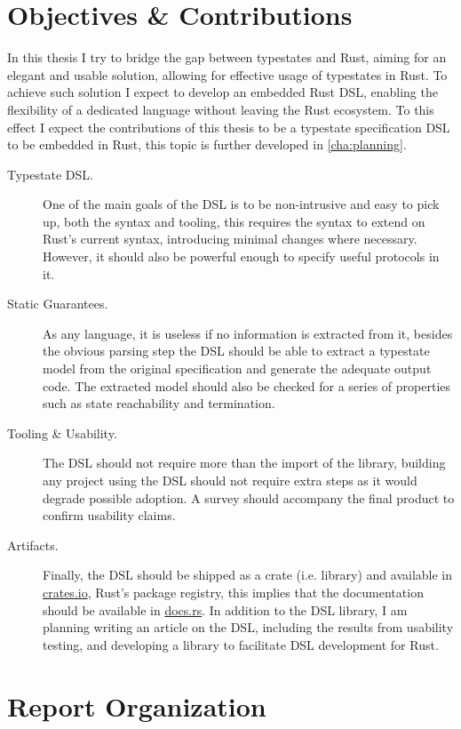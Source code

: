 \section{Objectives \& Contributions}\label{sec:objectives}

In this thesis I try to bridge the gap between typestates and Rust,
aiming for an elegant and usable solution, allowing for effective usage of typestates in Rust.
To achieve such solution I expect to develop an embedded Rust DSL,
enabling the flexibility of a dedicated language without leaving the Rust ecosystem.
To this effect I expect the contributions of this thesis to be a typestate specification DSL to be embedded in Rust,
this topic is further developed in \autoref{cha:planning}.

\begin{description}
    \item[Typestate DSL.] One of the main goals of the DSL is to be non-intrusive and easy to pick up, both the syntax and tooling,
          this requires the syntax to extend on Rust's current syntax, introducing minimal changes where necessary.
          However, it should also be powerful enough to specify useful protocols in it.
    \item[Static Guarantees.] As any language, it is useless if no information is extracted from it,
          besides the obvious parsing step the DSL should be able to extract a typestate model from the original specification
          and generate the adequate output code.
          The extracted model should also be checked for a series of properties such as state reachability and termination.
    \item[Tooling \& Usability.] The DSL should not require more than the import of the library,
          building any project using the DSL should not require extra steps as it would degrade possible adoption.
          A survey should accompany the final product to confirm usability claims.
    \item[Artifacts.] Finally, the DSL should be shipped as a crate (i.e. library) and available in \url{crates.io}, Rust's package registry,
          this implies that the documentation should be available in \url{docs.rs}.
          In addition to the DSL library, I am planning writing an article on the DSL, including the results from usability testing,
          and developing a library to facilitate DSL development for Rust.
\end{description}

\section{Report Organization}\label{sec:organization}

